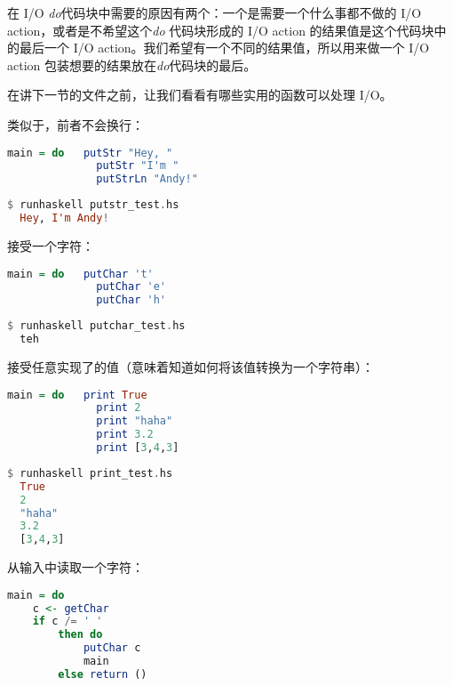 \documentclass[./main.tex]{subfiles}
\begin{document}
在 I/O \textit{do}代码块中需要的原因有两个：一个是需要一个什么事都不做的 I/O action，或者是不希望这个\textit{do}
代码块形成的 I/O action 的结果值是这个代码块中的最后一个 I/O action。我们希望有一个不同的结果值，所以用来做一个
I/O action 包装想要的结果放在\textit{do}代码块的最后。

在讲下一节的文件之前，让我们看看有哪些实用的函数可以处理 I/O。

类似于，前者不会换行：

\begin{lstlisting}[language=Haskell]
  main = do   putStr "Hey, "
              putStr "I'm "
              putStrLn "Andy!"
\end{lstlisting}

\begin{lstlisting}[language=Haskell]
  $ runhaskell putstr_test.hs
  Hey, I'm Andy!
\end{lstlisting}

接受一个字符：

\begin{lstlisting}[language=Haskell]
  main = do   putChar 't'
              putChar 'e'
              putChar 'h'
\end{lstlisting}

\begin{lstlisting}[language=Haskell]
  $ runhaskell putchar_test.hs
  teh
\end{lstlisting}

接受任意实现了的值（意味着知道如何将该值转换为一个字符串）：

\begin{lstlisting}[language=Haskell]
  main = do   print True
              print 2
              print "haha"
              print 3.2
              print [3,4,3]
\end{lstlisting}

\begin{lstlisting}[language=Haskell]
  $ runhaskell print_test.hs
  True
  2
  "haha"
  3.2
  [3,4,3]
\end{lstlisting}

从输入中读取一个字符：

\begin{lstlisting}[language=Haskell]
  main = do
    c <- getChar
    if c /= ' '
        then do
            putChar c
            main
        else return ()
\end{lstlisting}
\end{document}
